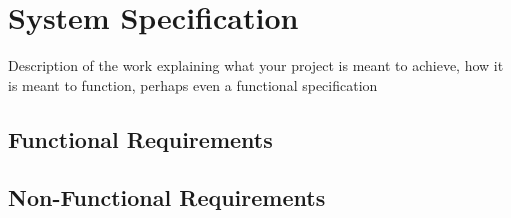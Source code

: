 \section{System Specification}
{\color{red} Description of the work explaining what your project is meant to achieve, how it is meant to function, perhaps even a functional specification}
	\subsection{Functional Requirements}
	\subsection{Non-Functional Requirements}